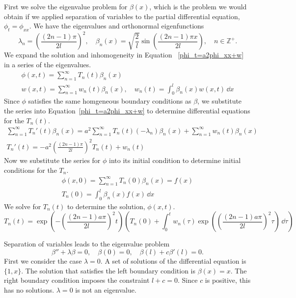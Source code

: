 {%
\begin{Solution}
  \label{solution pt=a2pxx+w p=0 px=0}
  First we solve the eigenvalue problem for $\beta(x)$, which is the
  problem we would obtain if we applied separation of variables to the
  partial differential equation, $\phi_t = \phi_{x x}$.  We have the
  eigenvalues and orthonormal eigenfunctions
  \[
  \lambda_n = \left( \frac{ (2n-1) \pi }{ 2 l } \right)^2, \quad
  \beta_n(x) = \sqrt{ \frac{2}{l} } \sin \left( \frac{ (2n-1) \pi x }
    { 2 l } \right), \quad
  n \in \mathbb{Z}^+.
  \]
  We expand the solution and inhomogeneity in Equation
  ~\ref{phi_t=a2phi_xx+w} in a series of the eigenvalues.
  \begin{gather*}
    \phi(x,t) = \sum_{n=1}^\infty T_n(t) \beta_n(x) \\
    w(x,t) = \sum_{n=1}^\infty w_n(t) \beta_n(x), \quad
    w_n(t) = \int_0^l \beta_n(x) w(x,t) \,\dd x
  \end{gather*}
  Since $\phi$ satisfies the same homgeneous boundary conditions as
  $\beta$, we substitute the series into Equation~\ref{phi_t=a2phi_xx+w}
  to determine differential equations for the $T_n(t)$.
  \begin{gather*}
    \sum_{n=1}^\infty T_n'(t) \beta_n(x) 
    = a^2 \sum_{n=1}^\infty T_n(t) (-\lambda_n) \beta_n(x)
    + \sum_{n=1}^\infty w_n(t) \beta_n(x) \\
    T_n'(t) = - a^2 \left( \frac{ (2n-1) \pi }{ 2 l } \right)^2 T_n(t)
    + w_n(t)
  \end{gather*}
  Now we substitute the series for $\phi$ into its initial condition to
  determine initial conditions for the $T_n$.
  \begin{gather*}
    \phi(x,0) = \sum_{n=1}^\infty T_n(0) \beta_n(x) = f(x) \\
    T_n(0) = \int_0^l \beta_n(x) f(x) \,\dd x
  \end{gather*}
  We solve for $T_n(t)$ to determine the solution, $\phi(x,t)$.
  \[
  T_n(t) = \exp \left( - \left( \frac{ (2n-1) a \pi }{ 2 l } \right)^2
    t \right) \left( T_n(0) + \int_0^t w_n(\tau) 
    \exp \left( \left( \frac{ (2n-1) a \pi }{ 2 l } \right)^2
      \tau \right) \,\dd \tau \right)
  \]
\end{Solution}





\begin{Solution}
  \label{solution heat p=0 cp+px=0}
  Separation of variables leads to the eigenvalue problem
  \[
  \beta'' + \lambda \beta = 0, \quad
  \beta(0) = 0, \quad
  \beta(l) + c \beta'(l) = 0.
  \]
  First we consider the case $\lambda = 0$.  A set of solutions of the
  differential equation is $\{ 1, x \}$.  The solution that satisfies
  the left boundary condition is $\beta(x) = x$.  The right boundary
  condition imposes the constraint $l + c = 0$.  Since $c$ is positive,
  this has no solutions.  $\lambda = 0$ is not an eigenvalue.


\end{Solution}}
